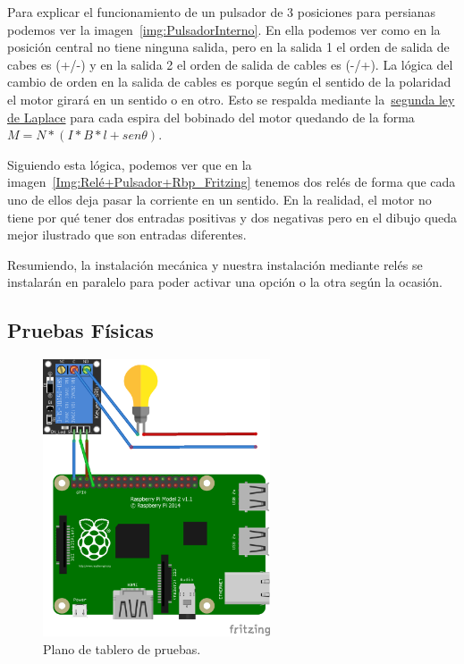 Para explicar el funcionamiento de un pulsador de 3 posiciones para persianas podemos ver la imagen~\ref{img:PulsadorInterno}. En ella podemos ver como en la posición central no tiene ninguna salida, pero en la salida 1 el orden de salida de cabes es (+/-) y en la salida 2 el orden de salida de cables es (-/+). La lógica del cambio de orden en la salida de cables es porque según el sentido de la polaridad el motor girará en un sentido o en otro. Esto se respalda mediante la~\href{https://fisica.laguia2000.com/dinamica-clasica/fuerzas/ley-de-laplace-fuerza-ejercida-sobre-un-conductor}{segunda ley de Laplace} para cada espira del bobinado del motor quedando de la forma~\href{http://www.uco.es/grupos/giie/cirweb/teoria/tema_11/tema_11_01.pdf}{$M=N*(I*B*l+sen\theta)$}.

Siguiendo esta lógica, podemos ver que en la imagen~\ref{Img:Relé+Pulsador+Rbp_Fritzing} tenemos dos relés de forma que cada uno de ellos deja pasar la corriente en un sentido. En la realidad, el motor no tiene por qué tener dos entradas positivas y dos negativas pero en el dibujo queda mejor ilustrado que son entradas diferentes.

Resumiendo, la instalación mecánica y nuestra instalación mediante relés se instalarán en paralelo para poder activar una opción o la otra según la ocasión.

\subsection{Pruebas Físicas}

\begin{figure}
    \centering
    \includegraphics[width=0.6\textwidth]{img/Plano_Placa_Pruebas.png}
    \caption{Plano de tablero de pruebas.} \label{Img:Plano_Placa_Pruebas}
\end{figure}

